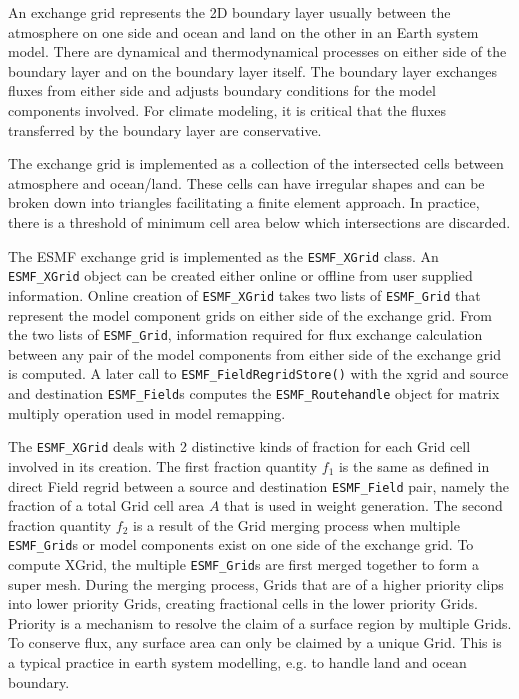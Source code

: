 
An exchange grid represents the 2D boundary layer usually between the
atmosphere on one side and ocean and land on the other in an Earth
system model. There are dynamical and thermodynamical processes on
either side of the boundary layer and on the boundary layer itself.
The boundary layer exchanges fluxes from either side and adjusts
boundary conditions for the model components involved. For climate modeling,
it is critical that the fluxes transferred by the boundary layer are
conservative.

The exchange grid is implemented as a collection of the intersected cells
between atmosphere and ocean/land\cite{BalajiXGrid}. These cells can have irregular shapes
and can be broken down into triangles facilitating a finite element
approach. In practice, there is a threshold of minimum cell area below
which intersections are discarded.

The ESMF exchange grid is implemented as the {\tt ESMF\_XGrid} class. 
An {\tt ESMF\_XGrid} object can be created either online or offline from
user supplied information. Online creation of {\tt ESMF\_XGrid} takes
two lists of {\tt ESMF\_Grid} that represent the model component grids on
either side of the exchange grid. From the two lists of {\tt ESMF\_Grid},
information required for flux exchange calculation between any pair of the 
model components from either side of the exchange grid is computed. A later
call to {\tt ESMF\_FieldRegridStore()} with the xgrid and source and destination
{\tt ESMF\_Field}s computes the {\tt ESMF\_Routehandle} object for matrix
multiply operation used in model remapping.

The {\tt ESMF\_XGrid} deals with 2 distinctive kinds of fraction for each Grid cell
involved in its creation. The first fraction quantity $f_1$ is the same as defined in direct
Field regrid between a source and destination {\tt ESMF\_Field} pair, namely the fraction
of a total Grid cell area $A$ that is used in weight generation. The second fraction quantity $f_2$
is a result of the Grid merging process when multiple {\tt ESMF\_Grid}s or model components
exist on one side of the exchange grid. To compute XGrid, the multiple {\tt ESMF\_Grid}s
are first merged together to form a super mesh. During the merging process, Grids that are
of a higher priority clips into lower priority Grids, creating fractional cells in the lower
priority Grids. Priority is a mechanism to resolve the claim of a surface region by multiple
Grids. To conserve flux, any surface area can only be claimed by a unique Grid. This is
a typical practice in earth system modelling, e.g. to handle land and ocean boundary.

